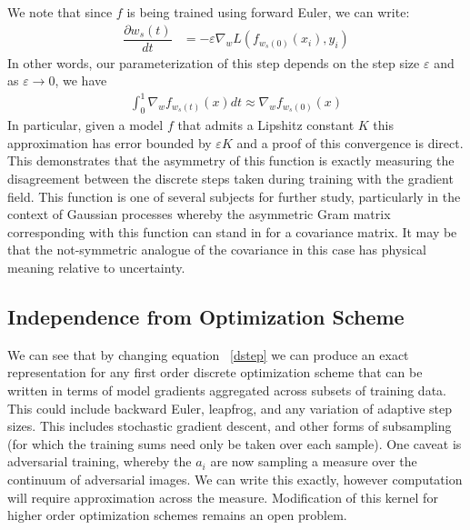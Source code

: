We note that since $f$ is being trained using forward Euler, we can write:
\begin{align}
    \dfrac{\partial w_s(t)}{dt} &= -\varepsilon \nabla_w L(f_{w_s(0)}(x_i), y_i) \label{dstep}%
\end{align}
In other words, our parameterization of this step depends on the step size $\varepsilon$ and as $\varepsilon \to 0$, we have 
\begin{align}
    \int_0^1 \nabla_w f_{w_{s}(t)}(x)dt \approx \nabla_w f_{w_s(0)}(x)
\end{align}
In particular, given a model $f$ that admits a Lipshitz constant $K$ this approximation has error bounded by $\varepsilon K$ and a proof of this convergence is direct. 
This demonstrates that the asymmetry of this function is exactly measuring the disagreement between the discrete steps taken during training with the gradient field. 
This function is one of several subjects for further study, particularly in the context of Gaussian processes whereby the asymmetric Gram matrix corresponding with this function can stand in for a covariance matrix. It may be that the not-symmetric analogue of the covariance in this case has physical meaning relative to uncertainty.

\subsection{Independence from Optimization Scheme}
We can see that by changing equation ~\ref{dstep} we can produce an exact representation for any first order discrete optimization scheme that can be written in terms of model gradients aggregated across subsets of training data. This could include backward Euler, leapfrog, and any variation of adaptive step sizes. This includes stochastic gradient descent, and other forms of subsampling (for which the training sums need only be taken over each sample). One caveat is adversarial training, whereby the $a_i$ are now sampling a measure over the continuum of adversarial images. We can write this exactly, however computation will require approximation across the measure. Modification of this kernel for higher order optimization schemes remains an open problem.


